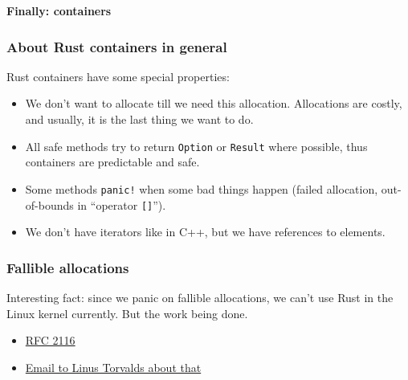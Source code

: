 \documentclass[aspectratio=1610,t]{beamer}
\begin{document}
\begin{frame}[c]
\centering\Huge\textbf{Finally: containers}
\end{frame}


\begin{frame}[fragile]
\frametitle{About Rust containers in general}
Rust containers have some special properties:

\begin{itemize}
    \item<2-> We don't want to allocate till we need this allocation. Allocations are costly, and usually, it is the last thing we want to do.
    \item<3-> All safe methods try to return \texttt{Option} or \texttt{Result} where possible, thus containers are predictable and safe.
    \item<4-> Some methods \texttt{panic!} when some bad things happen (failed allocation, out-of-bounds in ``operator \texttt{[]}'').
    \item<5-> We don't have iterators like in C++, but we have references to elements.
\end{itemize}

\end{frame}


\begin{frame}[fragile]
\frametitle{Fallible allocations}
Interesting fact: since we panic on fallible allocations, we can't use Rust in the Linux kernel currently. But the work being done.

\begin{itemize}
    \item \href{https://github.com/rust-lang/rfcs/blob/master/text/2116-alloc-me-maybe.md}{RFC 2116}
    \item \href{https://lore.kernel.org/lkml/YHdSATy9am21Tj4Z@localhost/}{Email to Linus Torvalds about that}
\end{itemize}
\end{frame}

\end{document}
